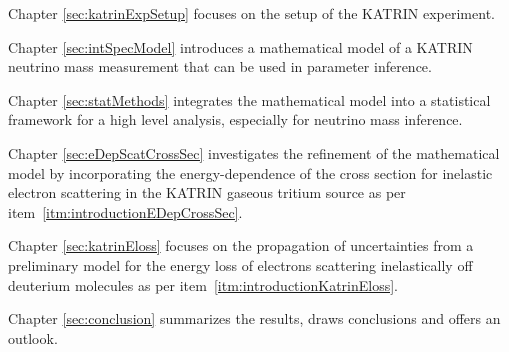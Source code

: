 Chapter \ref{sec:katrinExpSetup} focuses on the setup of the KATRIN experiment.

Chapter \ref{sec:intSpecModel} introduces a mathematical model of a KATRIN neutrino mass measurement that can be used in parameter inference.

Chapter \ref{sec:statMethods} integrates the mathematical model into a statistical framework for a high level analysis, especially for neutrino mass inference.

Chapter \ref{sec:eDepScatCrossSec} investigates the refinement of the mathematical model by incorporating the energy-dependence of the cross section for inelastic electron scattering in the KATRIN gaseous tritium source as per item~\ref{itm:introductionEDepCrossSec}.

Chapter \ref{sec:katrinEloss} focuses on the propagation of uncertainties from a preliminary model for the energy loss of electrons scattering inelastically off deuterium molecules as per item~\ref{itm:introductionKatrinEloss}. 

Chapter \ref{sec:conclusion} summarizes the results, draws conclusions and offers an outlook.